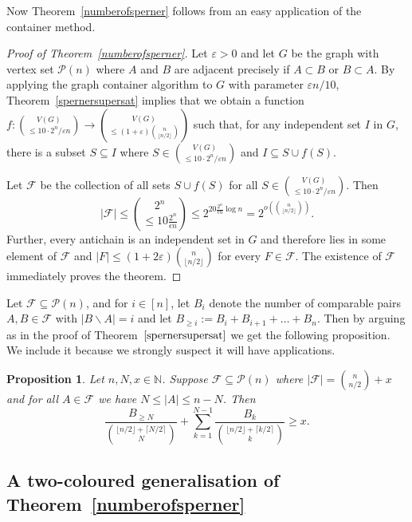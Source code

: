 \documentclass[11pt]{article}
\newtheorem{prop}[theorem]{Proposition}
\numberwithin{equation}{section}
\def\P{\mathcal{P}}
\def\eps{\varepsilon}
\begin{document}
Now Theorem~\ref{numberofsperner} follows from an easy application of the container method. 
\begin{proof}[Proof of Theorem~\ref{numberofsperner}]
Let $\eps >0$ and let $G$ be the graph with vertex set $\mathcal P(n)$ where $A$ and $B$ are adjacent precisely if $A \subset B$ or $B \subset A$.
By applying the graph container algorithm to $G$ with parameter $\eps n/10$, Theorem~\ref{spernersupersat} implies that we obtain a function 
$f : \binom{V(G)}{\leq 10 \cdot 2^n/\eps n} \to \binom{V(G)}{\leq (1+\eps)\binom{n}{\lfloor n/2\rfloor }}$  such that, for any independent set $I$ in $G$, there is a subset $S \subseteq I$ where 
$S \in \binom{V(G)}{\leq 10 \cdot 2^n/\eps n} $
 and   $I \subseteq S \cup f(S)$. 

Let $\mathcal F$ be the collection of all sets $S \cup f(S)$ for all $S \in\binom{V(G)}{\leq 10 \cdot 2^n/\eps n}$. Then
$$|\mathcal{F}|\leq \binom{2^n}{\leq 10\frac{2^n}{\epsilon n}}\leq 2^{20\frac{2^n}{\epsilon n} \log n}=2^{o\left(\binom{n}{\lfloor n/2\rfloor}\right)}.$$
Further, every antichain is an independent set in $G$ and therefore lies in some element of $ \mathcal F$ and $|F|\leq (1+2\eps)\binom{n}{\lfloor n/2\rfloor }$ for every $F \in \mathcal F$. The existence of $\mathcal F$ immediately proves the theorem.
\end{proof}



Let $\mathcal{F}\subseteq \P (n)$, and for $i\in [n]$, let $B_i$ denote the number of comparable pairs $A,B\in\mathcal{F}$ with $|B\backslash A|=i$ and let $B_{\geq i}:=B_i+B_{i+1}+\ldots+B_n$. Then by arguing as in the proof of 
 Theorem~$\ref{spernersupersat}$ we get the following proposition. We include it because we strongly suspect it will have applications.

\begin{prop}\label{spernerhypersupersat}
Let $n,N,x\in \mathbb N$. Suppose $\mathcal{F}\subseteq \mathcal{P}(n)$ where $|\mathcal{F}|=\binom{n}{n/2}+x$ and for all $A\in\mathcal{F}$ we have $N\leq|A|\leq n-N$. Then $$\frac{B_{\geq N}}{\binom{\lfloor n/2\rfloor + \lceil N/2 \rceil}{N}}+\sum_{k=1}^{N-1}\frac{B_k}{\binom{\lfloor n/2\rfloor + \lceil k/2 \rceil}{k}} \geq x.$$
\end{prop}


\subsection{A two-coloured generalisation of Theorem~\ref{numberofsperner}}\label{secb}
\end{document}
